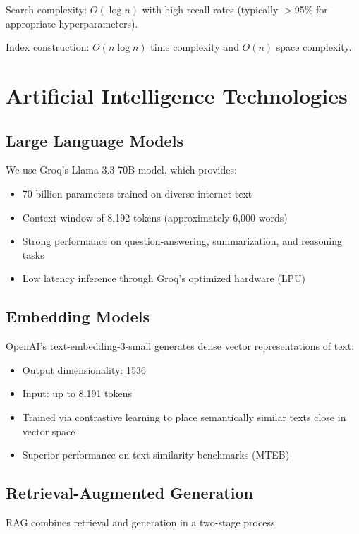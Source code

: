 \documentclass[12pt]{report}
\begin{document}
Search complexity: $O(\log n)$ with high recall rates (typically $>$95\% for appropriate hyperparameters).

Index construction: $O(n \log n)$ time complexity and $O(n)$ space complexity.

\section{Artificial Intelligence Technologies}

\subsection{Large Language Models}

We use Groq's Llama 3.3 70B model, which provides:
\begin{itemize}
    \item 70 billion parameters trained on diverse internet text
    \item Context window of 8,192 tokens (approximately 6,000 words)
    \item Strong performance on question-answering, summarization, and reasoning tasks
    \item Low latency inference through Groq's optimized hardware (LPU)
\end{itemize}

\subsection{Embedding Models}

OpenAI's text-embedding-3-small generates dense vector representations of text:
\begin{itemize}
    \item Output dimensionality: 1536
    \item Input: up to 8,191 tokens
    \item Trained via contrastive learning to place semantically similar texts close in vector space
    \item Superior performance on text similarity benchmarks (MTEB)
\end{itemize}

\subsection{Retrieval-Augmented Generation}

RAG combines retrieval and generation in a two-stage process:
\end{document}
